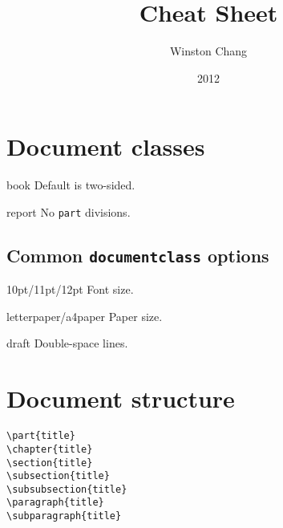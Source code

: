 \documentclass{refsheet}
\title{\LaTeXe Cheat Sheet}
\author{Winston Chang}
\date{2012}
\renewcommand{\maketitle}{%
{\begin{center}\Large \mythetitle\end{center}}
}
\begin{document}
\maketitle

\section{Document classes}

\begin{ttdesc}[labelwidth=\widthof{\texttt{report}}]
\item[book] Default is two-sided.
\item[report] No \texttt{part} divisions.
\end{ttdesc}

\subsection{Common \texttt{documentclass} options}

\begin{ttdesc}[labelwidth=\widthof{\ttfamily{letterpaper/a4paper}}]
\item[10pt/11pt/12pt] Font size.
\item[letterpaper/a4paper] Paper size.
\item[draft] Double-space lines.
\end{ttdesc}

\section{Document structure}

\vspace{-\baselineskip}

\begin{multicols*}{2}
\lstinline|\part{title}| \\
\lstinline|\chapter{title}| \\
\lstinline|\section{title}| \\
\lstinline|\subsection{title}| \\
\lstinline|\subsubsection{title}| \\
\lstinline|\paragraph{title}| \\
\lstinline|\subparagraph{title}|
\end{multicols*}
\end{document}
